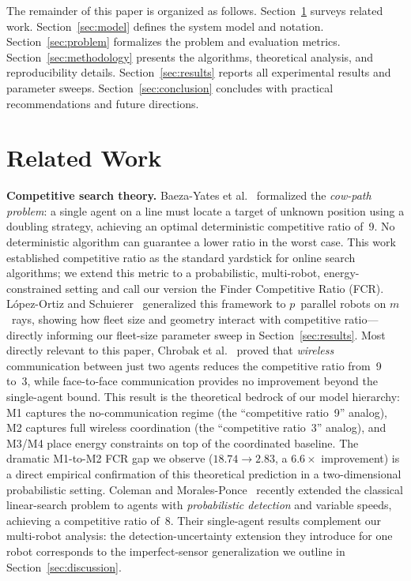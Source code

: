 \documentclass[conference]{IEEEtran}
\begin{document}
The remainder of this paper is organized as follows.
Section~\ref{sec:related} surveys related work.
Section~\ref{sec:model} defines the system model and notation.
Section~\ref{sec:problem} formalizes the problem and evaluation metrics.
Section~\ref{sec:methodology} presents the algorithms, theoretical analysis,
and reproducibility details.
Section~\ref{sec:results} reports all experimental results and parameter
sweeps.
Section~\ref{sec:conclusion} concludes with practical recommendations and
future directions.

\section{Related Work}\label{sec:related}

\textbf{Competitive search theory.}
Baeza-Yates et al.~\cite{BaezaYates1993} formalized the \emph{cow-path
problem}: a single agent on a line must locate a target of unknown position
using a doubling strategy, achieving an optimal deterministic competitive
ratio of~9.
No deterministic algorithm can guarantee a lower ratio in the worst case.
This work established competitive ratio as the standard yardstick for online
search algorithms; we extend this metric to a probabilistic, multi-robot,
energy-constrained setting and call our version the Finder Competitive Ratio
(FCR).
L\'{o}pez-Ortiz and Schuierer~\cite{LopezOrtiz2004} generalized this
framework to $p$~parallel robots on $m$~rays, showing how fleet size and
geometry interact with competitive ratio---directly informing our fleet-size
parameter sweep in Section~\ref{sec:results}.
Most directly relevant to this paper, Chrobak et al.~\cite{Chrobak2015}
proved that \emph{wireless} communication between just two agents reduces the
competitive ratio from~9 to~3, while face-to-face communication provides no
improvement beyond the single-agent bound.
This result is the theoretical bedrock of our model hierarchy: M1 captures
the no-communication regime (the ``competitive ratio~9'' analog), M2 captures
full wireless coordination (the ``competitive ratio~3'' analog), and M3/M4
place energy constraints on top of the coordinated baseline.
The dramatic M1-to-M2 FCR gap we observe ($18.74 \to 2.83$, a $6.6\times$
improvement) is a direct empirical confirmation of this theoretical prediction
in a two-dimensional probabilistic setting.
Coleman and Morales-Ponce~\cite{Coleman2025} recently extended the classical
linear-search problem to agents with \emph{probabilistic detection} and
variable speeds, achieving a competitive ratio of~8.
Their single-agent results complement our multi-robot analysis: the
detection-uncertainty extension they introduce for one robot corresponds to
the imperfect-sensor generalization we outline in
Section~\ref{sec:discussion}.
\end{document}

